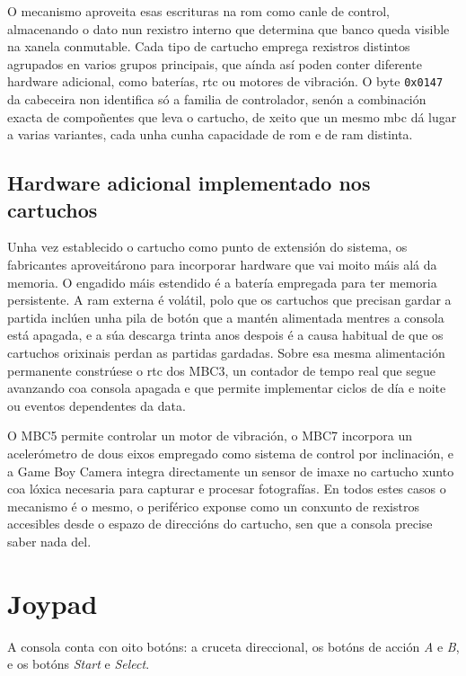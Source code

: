 O mecanismo aproveita esas escrituras na \acrshort{rom} como canle de control, almacenando o dato nun
rexistro interno que determina que banco queda visible na xanela conmutable.
Cada tipo de cartucho emprega rexistros distintos agrupados en varios grupos principais,
que aínda así poden conter diferente hardware adicional, como baterías, \acrfull{rtc}
ou motores de vibración.
O byte \texttt{0x0147} da cabeceira non identifica só a familia de controlador,
senón a combinación exacta de compoñentes que leva o cartucho, de xeito que un mesmo
\acrshort{mbc} dá lugar a varias variantes, cada unha cunha capacidade de \acrshort{rom}
e de \acrshort{ram} distinta.

\subsection{Hardware adicional implementado nos cartuchos}

Unha vez establecido o cartucho como punto de extensión do sistema, os fabricantes
aproveitárono para incorporar hardware que vai moito máis alá da memoria.
O engadido máis estendido é a batería empregada para ter memoria persistente.
A \acrshort{ram} externa é volátil, polo que os
cartuchos que precisan gardar a partida inclúen unha pila de botón que a mantén alimentada
mentres a consola está apagada, e a súa descarga trinta anos despois é a causa habitual de
que os cartuchos orixinais perdan as partidas gardadas.
Sobre esa mesma alimentación permanente constrúese o \acrshort{rtc} dos MBC3, un contador de
tempo real que segue avanzando coa consola apagada e que permite implementar ciclos de día
e noite ou eventos dependentes da data.

O MBC5 permite controlar un motor de vibración, 
o MBC7 incorpora un acelerómetro de dous eixos empregado como sistema de control por
inclinación, e a Game Boy Camera integra directamente un sensor de imaxe no cartucho
xunto coa lóxica necesaria para capturar e procesar fotografías.
En todos estes casos o mecanismo é o mesmo, o periférico exponse como un conxunto de
rexistros accesibles desde o espazo de direccións do cartucho, sen que a consola precise
saber nada del.

\section{Joypad}
\label{sec:joypad}

A consola conta con oito botóns: a cruceta direccional, os botóns de acción \textit{A} e \textit{B},
e os botóns \textit{Start} e \textit{Select}.

